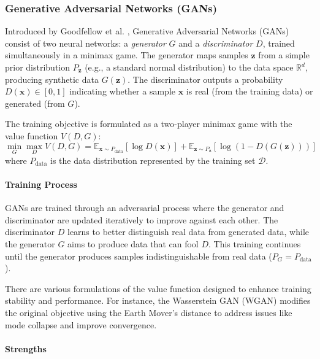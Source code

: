 \subsubsection{Generative Adversarial Networks (GANs)}

Introduced by Goodfellow et al. \cite{goodfellow2014generative}, Generative Adversarial Networks (GANs) consist of two neural networks: a \textit{generator} \( G \) and a \textit{discriminator} \( D \), trained simultaneously in a minimax game. The generator maps samples \( \mathbf{z} \) from a simple prior distribution \( P_{\mathbf{z}} \) (e.g., a standard normal distribution) to the data space \( \mathbb{R}^d \), producing synthetic data \( G(\mathbf{z}) \). The discriminator outputs a probability \( D(\mathbf{x}) \in [0,1] \) indicating whether a sample \( \mathbf{x} \) is real (from the training data) or generated (from \( G \)).

The training objective is formulated as a two-player minimax game with the value function \( V(D, G) \):
\[
\min_{G} \max_{D} V(D, G) = \mathbb{E}_{\mathbf{x} \sim P_{\text{data}}} [\log D(\mathbf{x})] + \mathbb{E}_{\mathbf{z} \sim P_{\mathbf{z}}} [\log (1 - D(G(\mathbf{z})))]
\]
where \( P_{\text{data}} \) is the data distribution represented by the training set \( \mathcal{D} \).

\paragraph{Training Process}

GANs are trained through an adversarial process where the generator and discriminator are updated iteratively to improve against each other. The discriminator \( D \) learns to better distinguish real data from generated data, while the generator \( G \) aims to produce data that can fool \( D \). This training continues until the generator produces samples indistinguishable from real data (\( P_{G} = P_{\text{data}} \)).

There are various formulations of the value function designed to enhance training stability and performance. For instance, the Wasserstein GAN (WGAN) \cite{arjovsky2017wasserstein} modifies the original objective using the Earth Mover's distance to address issues like mode collapse and improve convergence.

\paragraph{Strengths}

